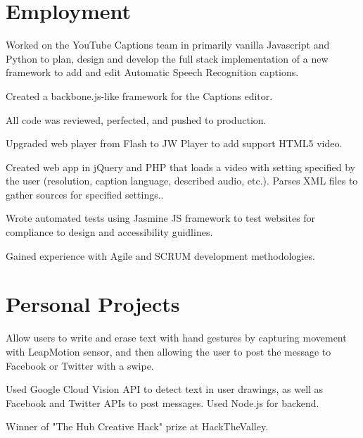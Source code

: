 \documentclass[]{deedy-resume-openfont}
\begin{document}
\begin{minipage}[t]{0.66\textwidth} 


\section{Employment}

\vspace{\topsep} %
\begin{tightemize}
\item Worked on the YouTube Captions team in primarily vanilla Javascript and Python to plan, design and develop the full stack implementation of a new framework to add and edit Automatic Speech Recognition captions.
\item Created a backbone.js-like framework for the Captions editor.
\item All code was reviewed, perfected, and pushed to production.
\end{tightemize}
\sectionsep

\begin{tightemize}
\item Upgraded web player from Flash to JW Player to add support HTML5 video.
\item Created web app in jQuery and PHP that loads a video with setting specified by the user (resolution, caption language, described audio, etc.). Parses XML files to gather sources for specified settings..
\item Wrote automated tests using Jasmine JS framework to test websites for compliance to design and accessibility guidlines.
\item Gained experience with Agile and SCRUM development methodologies.
\end{tightemize}
\sectionsep


\section{Personal Projects}
\begin{tightemize}
\item Allow users to write and erase text with hand gestures by capturing movement with LeapMotion sensor, and then allowing the user to post the message to Facebook or Twitter with a swipe. 
\item Used Google Cloud Vision API to detect text in user drawings, as well as Facebook and Twitter APIs to post messages. Used Node.js for backend.
\item Winner of "The Hub Creative Hack" prize at HackTheValley.
\end{tightemize}
\sectionsep


\end{minipage}
\end{document}
